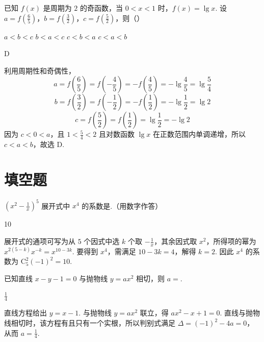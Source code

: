 \begin{problem}
已知 \(f(x)\) 是周期为 \(2\) 的奇函数，当 \(0 < x < 1\) 时，\(f(x) = \lg x\). 设 \(a = f\left(\frac{6}{5}\right)\)，\(b = f\left(\frac{3}{2}\right)\)，\(c = f\left(\frac{5}{2}\right)\)，则（\quad）

\choices
    {\(a < b < c\)}
    {\(b < a < c\)}
    {\(c < b < a\)}
    {\(c < a < b\)}
\end{problem}

\begin{answer}
D
\end{answer}

\begin{solution}
利用周期性和奇偶性，
\[
a=f\left(\frac{6}{5}\right)=f\left(-\frac{4}{5}\right)=-f\left(\frac{4}{5}\right)=-\lg\frac{4}{5}=\lg\frac{5}{4}
\]
\[
b=f\left(\frac{3}{2}\right)=f\left(-\frac{1}{2}\right)=-f\left(\frac{1}{2}\right)=-\lg\frac{1}{2}=\lg2
\]
\[
c=f\left(\frac{5}{2}\right)=f\left(\frac{1}{2}\right)=\lg\frac{1}{2}=-\lg2
\]
因为 \(c<0<a\)，且 \(1<\frac{5}{4}<2\) 且对数函数 \(\lg x\) 在正数范围内单调递增，所以 \(c<a<b\)，故选 D.
\end{solution}

\section{填空题}
\begin{problem}
\(\left(x^{2} - \frac{1}{x}\right)^{5}\) 展开式中 \(x^{4}\) 的系数是\fillinblank{}.（用数字作答）
\end{problem}

\begin{answer}
10
\end{answer}

\begin{solution}
展开式的通项可写为从 \(5\) 个因式中选 \(k\) 个取 \(-\frac{1}{x}\)，其余因式取 \(x^2\)，所得项的幂为
\(x^{2(5-k)}x^{-k}=x^{10-3k}\). 要得到 \(x^4\)，需满足 \(10-3k=4\)，解得 \(k=2\). 因此 \(x^4\) 的系数为
\(\mathrm C_5^2(-1)^2=10\).
\end{solution}

\begin{problem}
已知直线 \(x - y - 1 = 0\) 与抛物线 \(y = ax^2\) 相切，则 \(a =\)\fillinblank{}.
\end{problem}

\begin{answer}
\(\frac{1}{4}\)
\end{answer}

\begin{solution}
直线方程给出 \(y=x-1\). 与抛物线 \(y=ax^2\) 联立，得
\(ax^2-x+1=0\). 直线与抛物线相切时，该方程有且只有一个实根，所以判别式满足
\(\Delta=(-1)^2-4a=0\)，从而 \(a=\frac{1}{4}\).
\end{solution}

